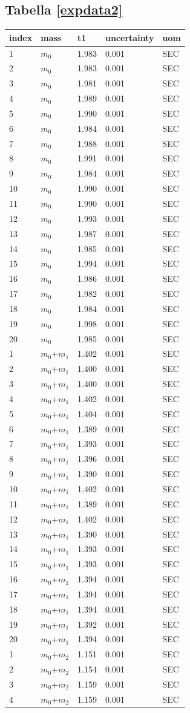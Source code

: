 \documentclass[11pt,a4paper]{article}
\begin{document}
\subsection{Tabella \ref{expdata2}}
\begin{longtable}[]{@{}lllll@{}}
\toprule
index & mass & t1 & uncertainty & uom  \tabularnewline
\midrule
\endhead
1 & $m_0$ & 1.983 & 0.001 & SEC \tabularnewline
2 & $m_0$ & 1.983 & 0.001 & SEC \tabularnewline
3 & $m_0$ & 1.981 & 0.001 & SEC \tabularnewline
4 & $m_0$ & 1.989 & 0.001 & SEC \tabularnewline
5 & $m_0$ & 1.990 & 0.001 & SEC \tabularnewline
6 & $m_0$ & 1.984 & 0.001 & SEC \tabularnewline
7 & $m_0$ & 1.988 & 0.001 & SEC \tabularnewline
8 & $m_0$ & 1.991 & 0.001 & SEC \tabularnewline
9 & $m_0$ & 1.984 & 0.001 & SEC \tabularnewline
10 & $m_0$ & 1.990 & 0.001 & SEC \tabularnewline
11 & $m_0$ & 1.990 & 0.001 & SEC \tabularnewline
12 & $m_0$ & 1.993 & 0.001 & SEC \tabularnewline
13 & $m_0$ & 1.987 & 0.001 & SEC \tabularnewline
14 & $m_0$ & 1.985 & 0.001 & SEC \tabularnewline
15 & $m_0$ & 1.994 & 0.001 & SEC \tabularnewline
16 & $m_0$ & 1.986 & 0.001 & SEC \tabularnewline
17 & $m_0$ & 1.982 & 0.001 & SEC \tabularnewline
18 & $m_0$ & 1.984 & 0.001 & SEC \tabularnewline
19 & $m_0$ & 1.998 & 0.001 & SEC \tabularnewline
20 & $m_0$ & 1.985 & 0.001 & SEC \tabularnewline
1 & $m_0$+$m_1$ & 1.402 & 0.001 & SEC \tabularnewline
2 & $m_0$+$m_1$ & 1.400 & 0.001 & SEC \tabularnewline
3 & $m_0$+$m_1$ & 1.400 & 0.001 & SEC \tabularnewline
4 & $m_0$+$m_1$ & 1.402 & 0.001 & SEC \tabularnewline
5 & $m_0$+$m_1$ & 1.404 & 0.001 & SEC \tabularnewline
6 & $m_0$+$m_1$ & 1.389 & 0.001 & SEC \tabularnewline
7 & $m_0$+$m_1$ & 1.393 & 0.001 & SEC \tabularnewline
8 & $m_0$+$m_1$ & 1.396 & 0.001 & SEC \tabularnewline
9 & $m_0$+$m_1$ & 1.390 & 0.001 & SEC \tabularnewline
10 & $m_0$+$m_1$ & 1.402 & 0.001 & SEC \tabularnewline
11 & $m_0$+$m_1$ & 1.389 & 0.001 & SEC \tabularnewline
12 & $m_0$+$m_1$ & 1.402 & 0.001 & SEC \tabularnewline
13 & $m_0$+$m_1$ & 1.390 & 0.001 & SEC \tabularnewline
14 & $m_0$+$m_1$ & 1.393 & 0.001 & SEC \tabularnewline
15 & $m_0$+$m_1$ & 1.393 & 0.001 & SEC \tabularnewline
16 & $m_0$+$m_1$ & 1.394 & 0.001 & SEC \tabularnewline
17 & $m_0$+$m_1$ & 1.394 & 0.001 & SEC \tabularnewline
18 & $m_0$+$m_1$ & 1.394 & 0.001 & SEC \tabularnewline
19 & $m_0$+$m_1$ & 1.392 & 0.001 & SEC \tabularnewline
20 & $m_0$+$m_1$ & 1.394 & 0.001 & SEC \tabularnewline
1 & $m_0$+$m_2$ & 1.151 & 0.001 & SEC \tabularnewline
2 & $m_0$+$m_2$ & 1.154 & 0.001 & SEC \tabularnewline
3 & $m_0$+$m_2$ & 1.159 & 0.001 & SEC \tabularnewline
4 & $m_0$+$m_2$ & 1.159 & 0.001 & SEC \tabularnewline

\end{longtable}
\end{document}
